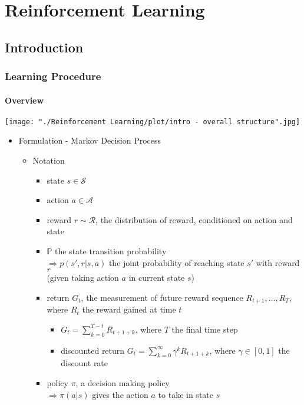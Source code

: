 \chapter{Reinforcement Learning}

\section{Introduction}

\subsection{Learning Procedure}
\subsubsection{Overview}
\texttt{[image: "./Reinforcement Learning/plot/intro - overall structure".jpg]}
\begin{itemize}
\item Formulation - Markov Decision Process
	\begin{itemize}
	\item Notation
		\begin{itemize}
		\item state $s \in \mathcal S$ 
		\item action $a \in \mathcal A$ 
		\item reward $r \sim \mathcal R$, the distribution of reward, conditioned on action and state
		\item $\mathbb P$ the state transition probability \\
		$\Rightarrow p(s',r|s,a)$ the joint probability of reaching state $s'$ with reward $r$ \\
		(given taking action $a$ in current state $s$) \\
		\item return $G_t$, the measurement of future reward sequence $R_{t+1},...,R_T$, \\
		where $R_t$ the reward gained at time $t$
			\begin{itemize}
			\item $G_t = \sum_{k=0}^{T-t} R_{t+1+k}$, where $T$ the final time step
			\item discounted return $G_t = \sum_{k=0}^\infty \gamma^k R_{t+1+k}$, where $\gamma\in[0,1]$ the discount rate
			\end{itemize}
		\item policy $\pi$, a decision making policy \\
		$\Rightarrow \pi (a|s)$ gives the action $a$ to take in state $s$
		\end{itemize}
	\end{itemize}
\end{itemize}

